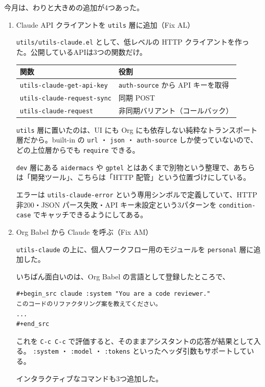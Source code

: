 \documentclass[11pt]{article}
\begin{document}
今月は、わりと大きめの追加が4つあった。
\begin{enumerate}
\item Claude API クライアントを \texttt{utils} 層に追加（Fix AL）
\label{sec:orgbedaa02}

\texttt{utils/utils-claude.el} として、低レベルの HTTP クライアントを作った。公開しているAPIは3つの関数だけ。

\begin{center}
\begin{tabular}{ll}
関数 & 役割\\
\hline
\texttt{utils-claude-get-api-key} & \texttt{auth-source} から API キーを取得\\
\texttt{utils-claude-request-sync} & 同期 POST\\
\texttt{utils-claude-request} & 非同期バリアント（コールバック）\\
\end{tabular}
\end{center}

\texttt{utils} 層に置いたのは、UI にも Org にも依存しない純粋なトランスポート層だから。built-in の \texttt{url} ・ \texttt{json} ・ \texttt{auth-source} しか使っていないので、どの上位層からでも \texttt{require} できる。

\texttt{dev} 層にある \texttt{aidermacs} や \texttt{gptel} とはあくまで別物という整理で、あちらは「開発ツール」、こちらは「HTTP 配管」という位置づけにしている。

エラーは \texttt{utils-claude-error} という専用シンボルで定義していて、HTTP 非200・JSON パース失敗・API キー未設定という3パターンを \texttt{condition-case} でキャッチできるようにしてある。
\item Org Babel から Claude を呼ぶ（Fix AM）
\label{sec:orge38c1df}

\texttt{utils-claude} の上に、個人ワークフロー用のモジュールを \texttt{personal} 層に追加した。

いちばん面白いのは、Org Babel の言語として登録したところで、

\begin{verbatim}
#+begin_src claude :system "You are a code reviewer."
このコードのリファクタリング案を教えてください。
...
#+end_src
\end{verbatim}

これを \texttt{C-c C-c} で評価すると、そのままアシスタントの応答が結果として入る。 \texttt{:system} ・ \texttt{:model} ・ \texttt{:tokens} といったヘッダ引数もサポートしている。

インタラクティブなコマンドも3つ追加した。


\end{enumerate}
\end{document}
